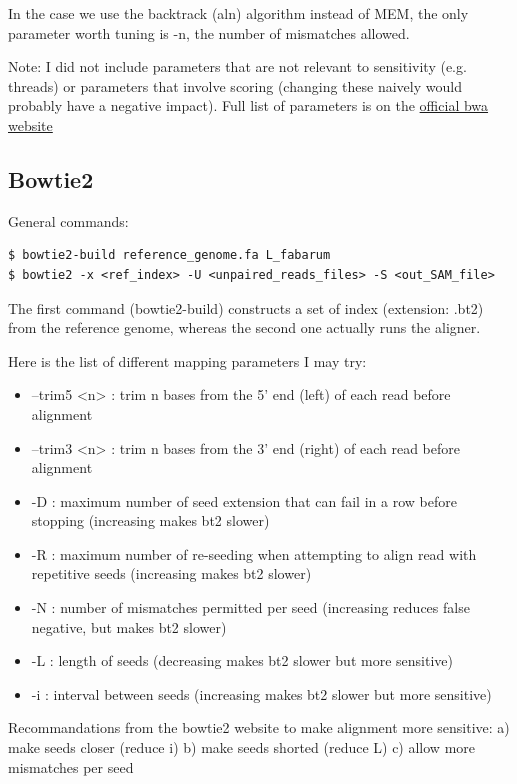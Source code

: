 \documentclass[10pt,a4paper]{report}
\begin{document}
In the case we use the backtrack (aln) algorithm instead of MEM, the only parameter worth tuning is -n, the number of mismatches allowed. 


Note: I did not include parameters that are not relevant to sensitivity (e.g. threads) or parameters that involve scoring (changing these naively would probably have a negative impact). Full list of parameters is on the \href{http://bio-bwa.sourceforge.net/bwa.shtml}{official bwa website}


\subsection{Bowtie2}
General commands: 
\begin{lstlisting}
$ bowtie2-build reference_genome.fa L_fabarum
$ bowtie2 -x <ref_index> -U <unpaired_reads_files> -S <out_SAM_file>
\end{lstlisting}
The first command (bowtie2-build) constructs a set of index (extension: .bt2) from the reference genome, whereas the second one actually runs the aligner.

Here is the list of different mapping parameters I may try:
\begin{itemize}
\item --trim5 <n> : trim n bases from the 5' end (left) of each read before alignment
\item --trim3 <n> : trim n bases from the 3' end (right) of each read before alignment
\item -D : maximum number of seed extension that can fail in a row before stopping (increasing makes bt2 slower)
\item -R : maximum number of re-seeding when attempting to align read with repetitive seeds (increasing makes bt2 slower)
\item -N : number of mismatches permitted per seed (increasing reduces false negative, but makes bt2 slower)
\item -L : length of seeds (decreasing makes bt2 slower but more sensitive)
\item -i : interval between seeds (increasing makes bt2 slower but more sensitive)
\end{itemize}

Recommandations from the bowtie2 website to make alignment more sensitive: 
a) make seeds closer (reduce i)
b) make seeds shorted (reduce L)
c) allow more mismatches per seed
\end{document}

